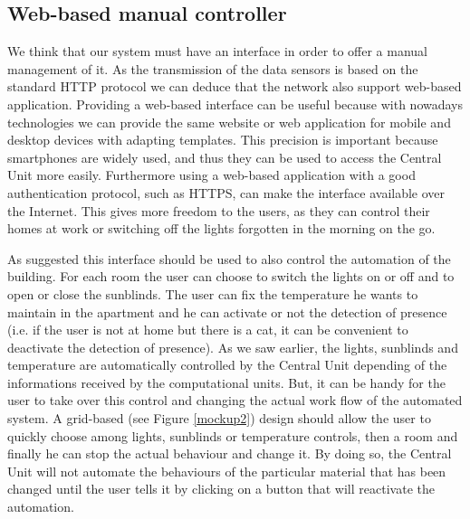 \documentclass{acm_proc_article-sp}
\begin{document}
\subsection{Web-based manual controller}
We think that our system must have an interface in order to offer a manual management of it.
As the transmission of the data sensors is based on the standard HTTP protocol we can deduce that the network also support web-based application.
Providing a web-based interface can be useful because with nowadays technologies we can provide the same website or web application for mobile and desktop devices with adapting templates.
This precision is important because smartphones are widely used, and thus they can be used to access the Central Unit more easily. 
Furthermore using a web-based application with a good authentication protocol, such as HTTPS, can make the interface available over the Internet.
This gives more freedom to the users, as they can control their homes at work or switching off the lights forgotten in the morning on the go.

As suggested this interface should be used to also control the automation of the building.
For each room the user can choose to switch the lights on or off and to open or close the sunblinds.
The user can fix the temperature he wants to maintain in the apartment and he can activate or not the detection of presence (i.e. if the user is not at home but there is a cat, it can be convenient to deactivate the detection of presence).
As we saw earlier, the lights, sunblinds and temperature are automatically controlled by the Central Unit depending of the informations received by the computational units. But, it can be handy for the user to take over this control and changing the actual work flow of the automated system.
A grid-based (see Figure \ref{mockup2}) design should allow the user to quickly choose among lights, sunblinds or temperature controls, then a room and finally he can stop the actual behaviour and change it. By doing so, the Central Unit will not automate the behaviours of the particular material that has been changed until the user tells it by clicking on a button that will reactivate the automation.
\end{document}
